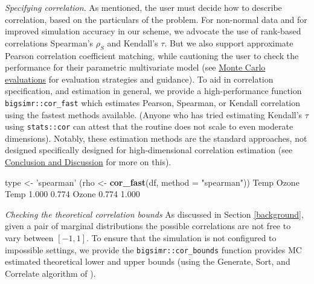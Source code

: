 \documentclass[]{article}
\newenvironment{Shaded}{\begin{snugshade}}{\end{snugshade}}
\newcommand{\DataTypeTok}[1]{\textcolor[rgb]{0.13,0.29,0.53}{#1}}
\newcommand{\DecValTok}[1]{\textcolor[rgb]{0.00,0.00,0.81}{#1}}
\newcommand{\FloatTok}[1]{\textcolor[rgb]{0.00,0.00,0.81}{#1}}
\newcommand{\KeywordTok}[1]{\textcolor[rgb]{0.13,0.29,0.53}{\textbf{#1}}}
\newcommand{\NormalTok}[1]{#1}
\newcommand{\OperatorTok}[1]{\textcolor[rgb]{0.81,0.36,0.00}{\textbf{#1}}}
\newcommand{\StringTok}[1]{\textcolor[rgb]{0.31,0.60,0.02}{#1}}
\begin{document}
\emph{Specifying correlation}.
As mentioned, the user must decide how to describe correlation, based on the particulars of the problem.
For non-normal data and for improved simulation accuracy in our scheme, we advocate the use of rank-based correlations Spearman's \(\rho_S\) and Kendall's \(\tau\).
But we also support approximate Pearson correlation coefficient matching, while cautioning the user to check the performance for their parametric multivariate model (see \protect\hyperlink{simulations}{Monte Carlo evaluations} for evaluation strategies and guidance).
To aid in correlation specification, and estimation in general, we provide a high-performance function \texttt{bigsimr::cor\_fast} which estimates Pearson, Spearman, or Kendall correlation using the fastest methods available.
(Anyone who has tried estimating Kendall's \(\tau\) using \texttt{stats::cor} can attest that the routine does not scale to even moderate dimensions).
Notably, these estimation methods are the standard approaches, not designed specifically designed for high-dimensional correlation estimation (see \href{\%7B\#discussion}{Conclusion and Discussion} for more on this).

\begin{Shaded}
\begin{Highlighting}[]
\NormalTok{type <-}\StringTok{ 'spearman'}
\NormalTok{(rho <-}\StringTok{ }\KeywordTok{cor_fast}\NormalTok{(df, }\DataTypeTok{method =} \StringTok{"spearman"}\NormalTok{))}
\NormalTok{       Temp Ozone}
\NormalTok{Temp  }\FloatTok{1.000} \FloatTok{0.774}
\NormalTok{Ozone }\FloatTok{0.774} \FloatTok{1.000}
\end{Highlighting}
\end{Shaded}

\emph{Checking the theoretical correlation bounds}
As discussed in Section \ref{background}, given a pair of marginal distributions the possible correlations are not free to vary between \([-1, 1]\).
To ensure that the simulation is not configured to impossible settings, we provide the \texttt{bigsimr::cor\_bounds} function provides MC estimated theoretical lower and upper bounds (using the Generate, Sort, and Correlate algorithm of \citet{DH2011}).

\begin{Shaded}
\end{Shaded}
\end{document}
